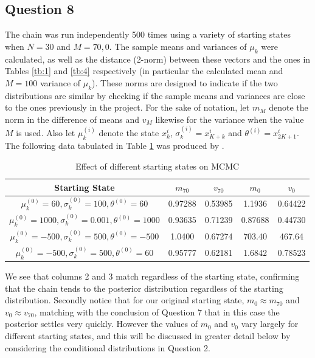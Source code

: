 \documentclass[10pt,a4paper,notitlepage]{article}
\begin{document}
\subsection*{\centering Question 8}
The chain was run independently 500 times using a variety of starting states when $N=30$ and $M=70,0$. The sample means and variances of $\mu_{k}$ were calculated, as well as the distance (2-norm) between these vectors and the ones in Tables \ref{tb:1} and \ref{tb:4} respectively (in particular the calculated mean and $M=100$ variance of $\mu_{k}$). These norms are designed to indicate if the two distributions are similar by checking if the sample means and variances are close to the ones previously in the project. For the sake of notation, let $m_{M}$ denote the norm in the difference of means and $v_{M}$ likewise for the variance when the value $M$ is used. Also let $\mu_{k}^{(i)}$ denote the state $x_{k}^{i}$, $\sigma^{(i)}_{k}=x^{i}_{K+k}$ and $\theta^{(i)}=x^{i}_{2K+1}$. The following data tabulated in Table \ref{tb:5} was produced by .
\begin{table}[H]
\centering
\begin{tabular}{c|cccc}
Starting State & $m_{70}$ & $v_{70}$ & $m_{0}$ & $v_{0}$\\ \hline 
$\mu^{(0)}_{k}=60, \sigma^{(0)}_{k}=100, \theta^{(0)}=60$ &0.97288 & 0.53985 & 1.1936 & 0.64422\\ \hline
$\mu^{(0)}_{k}=1000, \sigma^{(0)}_{k}=0.001, \theta^{(0)}=1000$ & 0.93635 & 0.71239 & 0.87688 & 0.44730\\ \hline
$\mu^{(0)}_{k}=-500, \sigma^{(0)}_{k}=500, \theta^{(0)}=-500$ & 1.0400 & 0.67274 & 703.40 & 467.64\\
\hline
$\mu^{(0)}_{k}=-500, \sigma^{(0)}_{k}=500, \theta^{(0)}=60$ & 0.95777 & 0.62181 & 1.6842 & 0.78523\\
\end{tabular}
\caption{Effect of different starting states on MCMC}\label{tb:5}
\end{table}
We see that columns 2 and 3 match regardless of the starting state, confirming that the chain tends to the posterior distribution regardless of the starting distribution. Secondly notice that for our original starting state, $m_{0}\approx m_{70}$ and $v_{0}\approx v_{70}$, matching with the conclusion of Question 7 that in this case the posterior settles very quickly. However the values of $m_{0}$ and $v_{0}$ vary largely for different starting states, and this will be discussed in greater detail below by considering the conditional distributions in Question 2.\\
\end{document}

